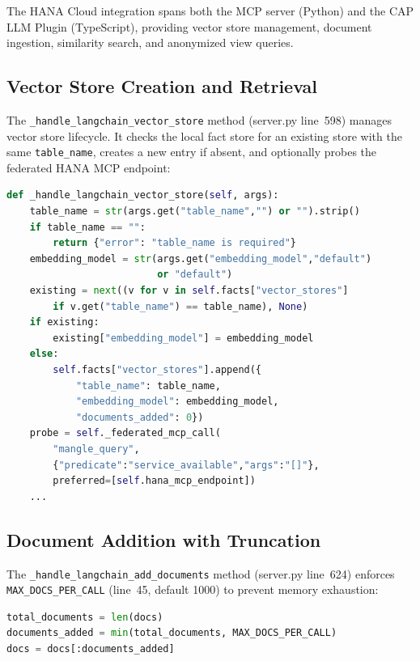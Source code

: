 \documentclass[11pt]{article}
\newcommand{\code}[1]{\texttt{#1}}
\begin{document}
The HANA Cloud integration spans both the MCP server (Python) and the
CAP LLM Plugin (TypeScript), providing vector store management,
document ingestion, similarity search, and anonymized view queries.

\subsection{Vector Store Creation and Retrieval}

The \code{\_handle\_langchain\_vector\_store} method (server.py line~598)
manages vector store lifecycle.  It checks the local fact store for an
existing store with the same \code{table\_name}, creates a new entry if
absent, and optionally probes the federated HANA MCP endpoint:

\begin{lstlisting}[language=Python,caption={Vector store handler (server.py lines 598--622)},label=lst:vector-store]
def _handle_langchain_vector_store(self, args):
    table_name = str(args.get("table_name","") or "").strip()
    if table_name == "":
        return {"error": "table_name is required"}
    embedding_model = str(args.get("embedding_model","default")
                          or "default")
    existing = next((v for v in self.facts["vector_stores"]
        if v.get("table_name") == table_name), None)
    if existing:
        existing["embedding_model"] = embedding_model
    else:
        self.facts["vector_stores"].append({
            "table_name": table_name,
            "embedding_model": embedding_model,
            "documents_added": 0})
    probe = self._federated_mcp_call(
        "mangle_query",
        {"predicate":"service_available","args":"[]"},
        preferred=[self.hana_mcp_endpoint])
    ...
\end{lstlisting}

\subsection{Document Addition with Truncation}

The \code{\_handle\_langchain\_add\_documents} method (server.py line~624)
enforces \code{MAX\_DOCS\_PER\_CALL} (line~45, default 1000) to prevent
memory exhaustion:

\begin{lstlisting}[language=Python,caption={Document truncation (server.py lines 632--634)},label=lst:doc-truncate]
total_documents = len(docs)
documents_added = min(total_documents, MAX_DOCS_PER_CALL)
docs = docs[:documents_added]
\end{lstlisting}
\end{document}
